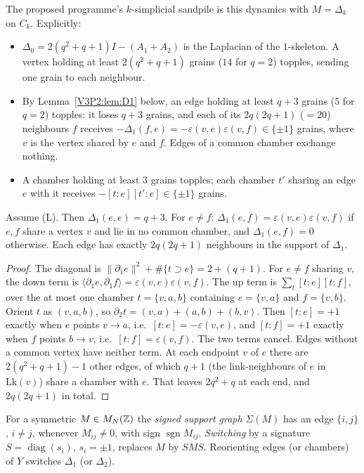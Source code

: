 The proposed programme's $k$-simplicial sandpile is this dynamics with $M=\Delta_k$ on $C_k$.
Explicitly:

\begin{itemize}
\item[$k=0$.] $\Delta_0=2(q^{2}+q+1)I-(A_1+A_2)$ is the Laplacian of the $1$-skeleton. A
vertex holding at least $2(q^{2}+q+1)$ grains ($14$ for $q=2$) topples, sending one grain to
each neighbour.
\item[$k=1$.] By Lemma~\ref{V3P2:lem:D1} below, an edge holding at least $q+3$ grains
($5$ for $q=2$) topples: it loses $q+3$ grains, and each of its $2q(2q+1)$ ($=20$) neighbours
$f$ receives $-\Delta_1(f,e)=-\varepsilon(v,e)\varepsilon(v,f)\in\{\pm1\}$ grains, where $v$
is the vertex shared by $e$ and $f$. Edges of a common chamber exchange nothing.
\item[$k=2$.] A chamber holding at least $3$ grains topples; each chamber $t'$ sharing an
edge $e$ with it receives $-[t:e][t':e]\in\{\pm1\}$ grains.
\end{itemize}

\begin{lemma}\label{V3P2:lem:D1}
Assume \textup{(L)}. Then $\Delta_1(e,e)=q+3$. For $e\neq f$:
$\Delta_1(e,f)=\varepsilon(v,e)\varepsilon(v,f)$ if $e,f$ share a vertex $v$ and lie in no
common chamber, and $\Delta_1(e,f)=0$ otherwise. Each edge has exactly $2q(2q+1)$
neighbours in the support of $\Delta_1$.
\end{lemma}

\begin{proof}
The diagonal is $\|\partial_1e\|^{2}+\#\{t\supset e\}=2+(q+1)$. For $e\neq f$ sharing $v$,
the down term is $\langle\partial_1e,\partial_1f\rangle=\varepsilon(v,e)\varepsilon(v,f)$. The
up term is $\sum_t[t:e][t:f]$, over the at most one chamber $t=\{v,a,b\}$ containing
$e=\{v,a\}$ and $f=\{v,b\}$. Orient $t$ as $(v,a,b)$, so $\partial_2t=(v,a)+(a,b)+(b,v)$.
Then $[t:e]=+1$ exactly when $e$ points $v\to a$, i.e.\ $[t:e]=-\varepsilon(v,e)$, and
$[t:f]=+1$ exactly when $f$ points $b\to v$, i.e.\ $[t:f]=\varepsilon(v,f)$. The two terms
cancel. Edges without a common vertex have neither term. At each endpoint $v$ of $e$ there
are $2(q^{2}+q+1)-1$ other edges, of which $q+1$ (the link-neighbours of $e$ in
$\mathrm{Lk}(v)$) share a chamber with $e$. That leaves $2q^{2}+q$ at each end, and
$2q(2q+1)$ in total.
\end{proof}

\begin{definition}\label{V3P2:def:signed}
For a symmetric $M\in M_N(\mathbb{Z})$ the \emph{signed support graph} $\Sigma(M)$ has an edge
$\{i,j\}$, $i\neq j$, whenever $M_{ij}\neq0$, with sign $\operatorname{sgn}M_{ij}$.
\emph{Switching} by a signature $S=\operatorname{diag}(s_i)$, $s_i=\pm1$, replaces $M$ by
$SMS$. Reorienting edges (or chambers) of $Y$ switches $\Delta_1$ (or $\Delta_2$).
\end{definition}

